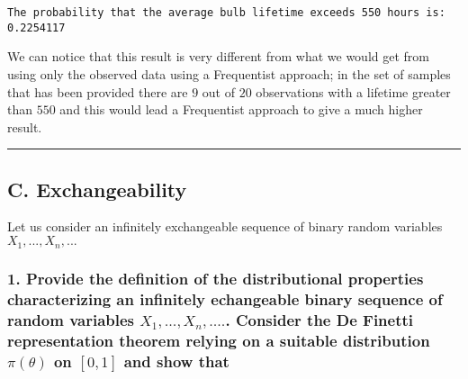 \documentclass[
]{article}
\begin{document}
\begin{verbatim}
The probability that the average bulb lifetime exceeds 550 hours is: 0.2254117
\end{verbatim}

We can notice that this result is very different from what we would get
from using only the observed data using a Frequentist approach; in the
set of samples that has been provided there are \(9\) out of \(20\)
observations with a lifetime greater than \(550\) and this would lead a
Frequentist approach to give a much higher result.

\begin{center}\rule{0.5\linewidth}{0.5pt}\end{center}

\newpage

\hypertarget{c.-exchangeability}{%
\subsection{C. Exchangeability}\label{c.-exchangeability}}

Let us consider an infinitely exchangeable sequence of binary random
variables \(X_1,...,X_n,...\)

\hypertarget{provide-the-definition-of-the-distributional-properties-characterizing-an-infinitely-echangeable-binary-sequence-of-random-variables-x_1-...x_n-.....-consider-the-de-finetti-representation-theorem-relying-on-a-suitable-distribution-pitheta-on-01-and-show-that}{%
\subsubsection{\texorpdfstring{1. Provide the definition of the
distributional properties characterizing an infinitely echangeable
binary sequence of random variables \(X_1, ...,X_n, ....\). Consider the
De Finetti representation theorem relying on a suitable distribution
\(\pi(\theta)\) on \([0,1]\) and show
that}{1. Provide the definition of the distributional properties characterizing an infinitely echangeable binary sequence of random variables X\_1, ...,X\_n, ..... Consider the De Finetti representation theorem relying on a suitable distribution \textbackslash pi(\textbackslash theta) on {[}0,1{]} and show that}}\label{provide-the-definition-of-the-distributional-properties-characterizing-an-infinitely-echangeable-binary-sequence-of-random-variables-x_1-...x_n-.....-consider-the-de-finetti-representation-theorem-relying-on-a-suitable-distribution-pitheta-on-01-and-show-that}}
\end{document}

